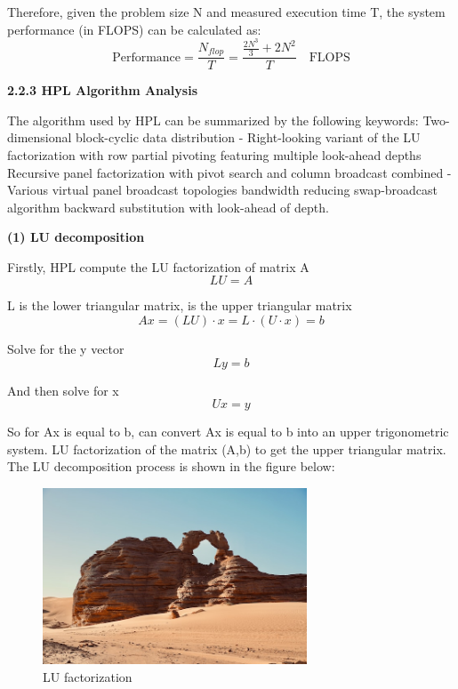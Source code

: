 \documentclass[a4paper,12pt]{article}
\begin{document}
Therefore, given the problem size N and measured execution time T, the system performance (in FLOPS) can be calculated as:
\begin{equation}
    \text{Performance} = \frac{N_{flop}}{T} = \frac{\frac{2N^3}{3} + 2N^2}{T} \quad \text{FLOPS}
\end{equation}

\textbf{2.2.3 HPL Algorithm Analysis}

The algorithm used by HPL can be summarized by the following keywords: Two-dimensional block-cyclic data distribution - Right-looking variant of the LU factorization with row partial pivoting featuring multiple look-ahead depths Recursive panel factorization with pivot search and column broadcast combined - Various virtual panel broadcast topologies bandwidth reducing swap-broadcast algorithm backward substitution with look-ahead of depth.

\textbf{(1) LU decomposition}

Firstly, HPL compute the LU factorization of matrix A
\begin{equation*}
LU=A
\end{equation*}

L is the lower triangular matrix, is the upper triangular matrix
\begin{equation*}
Ax=(LU) \cdot x=L \cdot (U \cdot x)=b
\end{equation*}

Solve for the y vector
\begin{equation*}
Ly=b
\end{equation*}

And then solve for x
\begin{equation*}
U x=y
\end{equation*}

So for Ax is equal to b, can convert Ax is equal to b into an upper trigonometric system. LU factorization of the matrix (A,b) to get the upper triangular matrix. The LU decomposition process is shown in the figure below:

\begin{figure}[H]
    \centering
    \includegraphics[width=0.7\textwidth]{LU_factorization.png}
    \caption{LU factorization}
    \label{fig:lu_factorization}
\end{figure}
\end{document}
